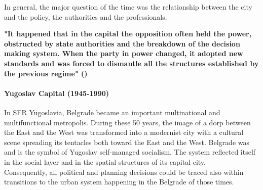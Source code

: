 \documentclass[11pt]{report}
\begin{document}
In general, the major question of the time was the relationship between the city and the policy, the authorities and the professionals.

\textbf{"It happened that in the capital the opposition often held the power, obstructed by state authorities and the breakdown of the decision making system. When the party in power changed, it adopted new standards and was forced to dismantle all the structures established by the previous regime" (\href{Dubravka}{\citealt{dubravka_stojanovic_kontroverze_2015}})}

\paragraph{Yugoslav Capital (1945-1990)}

In SFR Yugoslavia, Belgrade became an important multinational and multifunctional metropolis. During these 50 years, the image of a dorp between the East and the West was transformed into a modernist city with a cultural scene spreading its tentacles both toward the East and the West. Belgrade was and is the symbol of Yugoslav self-managed socialism. The system reflected itself in the social layer and in the spatial structures of its capital city.
\\

Consequently, all political and planning decisions could be traced also within transitions to the urban system happening in the Belgrade of those times.
\end{document}
